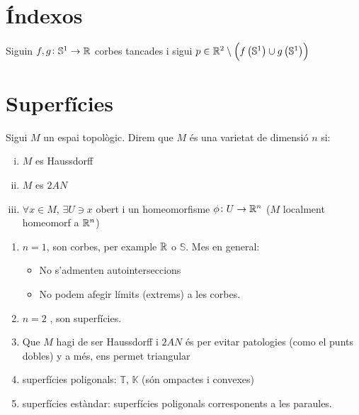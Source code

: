 \section{Índexos}
\begin{teo*}
    Siguin $f, g \colon \mathbb{S}^1 \to \mathbb{R}$ corbes tancades i sigui $p\in \mathbb{R}^2 \setminus \left( f\left( \mathbb{S}^1\right) \cup g\left( \mathbb{S}^1\right)\right)$
\end{teo*}

\section{Superfícies}

\begin{defi}[Varietat]
    Sigui $M$ un espai topològic. Direm que $M$ és una varietat de dimensió $n$ si:
    \begin{enumerate}[i)]
	\item $M$ es Haussdorff
	\item $M$ es $2AN$
	\item $\forall x \in M$, $\exists U \ni x$ obert i un homeomorfisme
	    $\phi \colon U \to \mathbb{R}^n$ ($M$ localment homeomorf a $\mathbb{R}^n$)
    \end{enumerate}
\end{defi}

\begin{example}
    \begin{enumerate}
	\item $n = 1$, son corbes, per example $\mathbb{R}$ o $\mathbb{S}$. Mes en general:
	    \begin{itemize}
		\item No s'admenten autointerseccions
		\item No podem afegir límits (extrems) a les corbes.
	    \end{itemize}
	\item $n = 2$ , son superfícies.
	\item Que $M$ hagi de ser Haussdorff i $2AN$ és per evitar patologies (como el punts
	    dobles) y a més, ens permet triangular
	\item superfícies poligonals: $\mathbb{T}$, $\mathbb{K}$ (són ompactes i convexes)
	\item superfícies estàndar: superfícies poligonals corresponents a les paraules.
    \end{enumerate}
\end{example}

